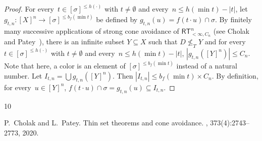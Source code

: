 \documentclass{article}
\newcommand{\RT}[0]{\mathsf{RT}}
\newcommand{\NN}[0]{\mathbb{N}}
\numberwithin{theorem}{section}
\newtheorem{lemma}[theorem]{Lemma}
\begin{document}

\begin{proof}
For every~$t \in [\sigma]^{\leq h(\cdot)}$ with $t \neq \emptyset$ and every~$n \leq h(\min t) - |t|$, let $g_{t, n} : [X]^n \to [\sigma]^{\leq b_f(\min t)}$ be defined by $g_{t, n}(u) = f(t \cdot u) \cap \sigma$. By finitely many successive applications of strong cone avoidance of $\RT^n_{<\infty, C_n}$ (see Cholak and Patey~\cite{cholak2020thin}), there is an infinite subset $Y \subseteq X$ such that $D \not \leq_T Y$ and for every~$t \in [\sigma]^{\leq h(\cdot)}$ with $t \neq \emptyset$ and every~$n \leq h(\min t) - |t|$, $|g_{t, n}([Y]^n)| \leq C_n$. Note that here, a color is an element of $[\sigma]^{\leq b_f(\min t)}$ instead of a natural number. Let $I_{t, n} = \bigcup g_{t, n}([Y]^n)$. Then $|I_{t, n}| \leq b_f(\min t) \times C_n$. By definition, for every~$u \in [Y]^n$, $f(t \cdot u) \cap \sigma = g_{t, n}(u) \subseteq I_{t, n}$.
\end{proof}

\begin{thebibliography}{10}

P.~Cholak and L.~Patey.
\newblock Thin set theorems and cone avoidance.
, 373(4):2743--2773, 2020.

\end{thebibliography}
\end{document}

